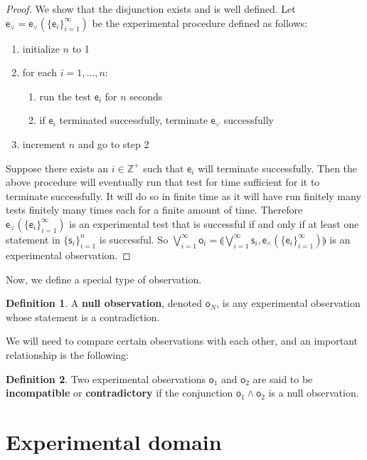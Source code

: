 \documentclass[review]{elsarticle}
\theoremstyle{plain}%
\theoremstyle{definition}
\newtheorem{defn}{Definition}[section]
\theoremstyle{remark}
\begin{document}
\begin{proof}
	We show that the disjunction exists and is well defined. Let $\mathsf{e}_\vee=\mathsf{e}_\vee(\{\mathsf{e}_i\}_{i=1}^{\infty})$ be the experimental procedure defined as follows:
	\begin{enumerate}
	\item initialize $n$ to 1
	\item for each $i=1,\ldots,n$:
	\begin{enumerate}
		\item run the test $\mathsf{e}_i$ for $n$ seconds
		\item if $\mathsf{e}_i$ terminated successfully, terminate $\mathsf{e}_\vee$ successfully
	\end{enumerate}
	\item increment $n$ and go to step 2
	\end{enumerate}
	Suppose there exists an $i \in \mathbb{Z}^+$ such that $\mathsf{e}_i$ will terminate successfully. Then the above procedure will eventually run that test for time sufficient for it to terminate successfully. It will do so in finite time as it will have run finitely many tests finitely many times each for a finite amount of time. Therefore $\mathsf{e}_\vee(\{\mathsf{e}_i\}_{i=1}^{\infty})$ is an experimental test that is successful if and only if at least one statement in $\{\mathsf{s}_i\}_{i=1}^{n}$ is successful. So $\bigvee\limits_{i=1}^{\infty} \mathsf{o}_i =\llparenthesis\bigvee\limits_{i=1}^{\infty} \mathsf{s}_i, \mathsf{e}_{\wedge}(\{\mathsf{e}_i\}_{i=1}^{\infty})\rrparenthesis$ is an experimental observation.
\end{proof}

Now, we define a special type of observation.

\begin{defn}
A \textbf{null observation}, denoted $\mathsf{o}_N$, is any experimental observation whose statement is a contradiction.
\end{defn}

We will need to compare certain observations with each other, and an important relationship is the following:
\begin{defn}
Two experimental observations $\mathsf{o}_1$ and $\mathsf{o}_2$ are said to be \textbf{incompatible} or \textbf{contradictory} if the conjunction $\mathsf{o}_1\wedge\mathsf{o}_2$ is a null observation.
\end{defn}


\section{Experimental domain}
\end{document}
